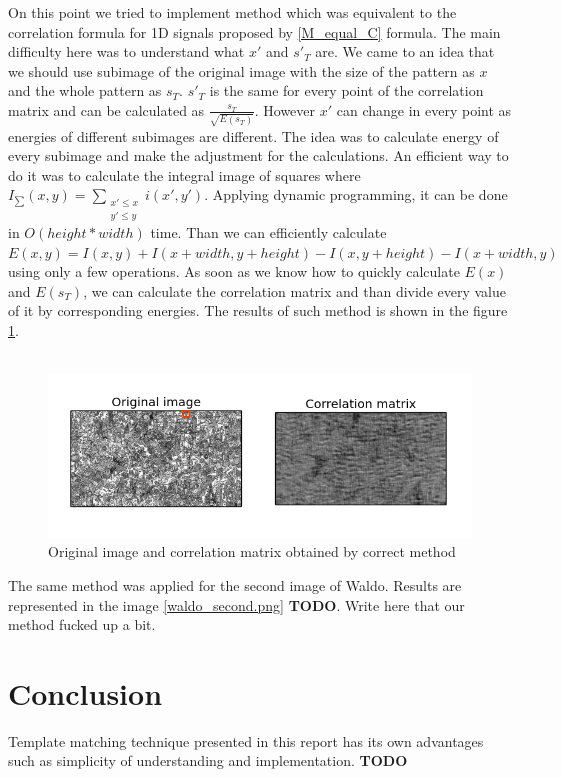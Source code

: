 \documentclass[a4paper]{article}
\begin{document}
On this point we tried to implement method which was equivalent to the correlation formula for 1D signals proposed by \ref{M_equal_C} formula. The main difficulty here was to understand what $x'$ and $s'_T$ are. We came to an idea that we should use subimage of the original image with the size of the pattern as $x$ and the whole pattern as $s_T$. $s'_T$ is the same for every point of the correlation matrix and can be calculated as $\frac{s_T}{\sqrt{E(s_T)}}$. However $x'$ can change in every point as energies of different subimages are different. The idea was to calculate energy of every subimage and make the adjustment for the calculations. An efficient way to do it was to calculate the integral image of squares where  $I_{\sum}(x,y) = \sum_{\begin{smallmatrix} x' \le x \\ y' \le y\end{smallmatrix}} i(x',y')$. Applying dynamic programming, it can be done in $O(height*width)$ time. Than we can efficiently calculate $E(x, y) = I(x, y) + I(x + width, y + height) - I(x, y + height) - I(x + width, y)$ using only a few operations. As soon as we know how to quickly calculate $E(x)$ and $E(s_T)$, we can calculate the correlation matrix and than divide every value of it by corresponding energies. The results of such method is shown in the figure \ref{correlate2D_second.png}.\\\\
\begin{figure}[ht!]
	\label{correlate2D_second.png}
	\center
	\includegraphics[width=0.8\linewidth]{img_double_2_edited.png}
	\caption{Original image and correlation matrix obtained by correct method}
\end{figure}
The same method was applied for the second image of Waldo. Results are represented in the image \ref{waldo_second.png} \textbf{TODO}. Write here that our method fucked up a bit.











\section{Conclusion}
Template matching technique presented in this report has its own advantages such as simplicity of understanding and implementation. \textbf{TODO}
\end{document}
